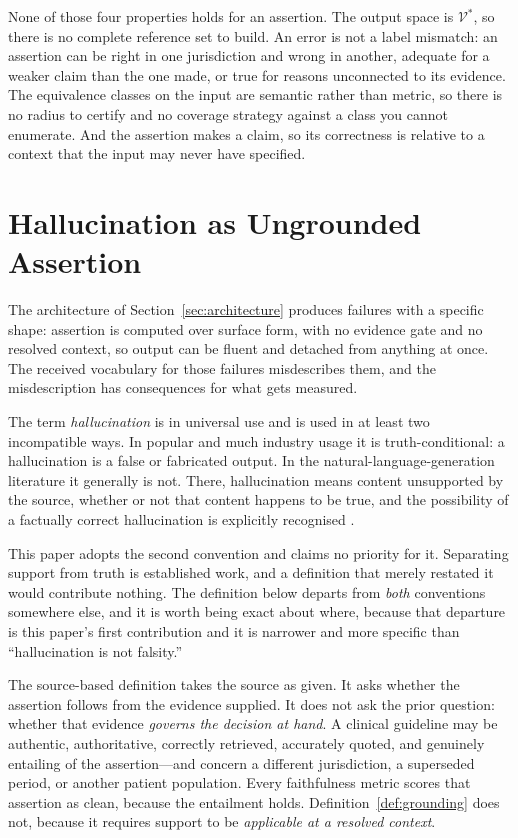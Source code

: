 \documentclass[11pt]{article}
\theoremstyle{plain}
\theoremstyle{definition}
\begin{document}
None of those four properties holds for an assertion. The output space is
$\mathcal{V}^{*}$, so there is no complete reference set to build. An error is not a
label mismatch: an assertion can be right in one jurisdiction and wrong in another,
adequate for a weaker claim than the one made, or true for reasons unconnected to
its evidence. The equivalence classes on the input are semantic rather than metric,
so there is no radius to certify and no coverage strategy against a class you cannot
enumerate. And the assertion makes a claim, so its correctness is relative to a
context that the input may never have specified.


\section{Hallucination as Ungrounded Assertion}
\label{sec:taxonomy}

The architecture of Section~\ref{sec:architecture} produces failures with a specific
shape: assertion is computed over surface form, with no evidence gate and no resolved
context, so output can be fluent and detached from anything at once. The received
vocabulary for those failures misdescribes them, and the misdescription has consequences
for what gets measured.

The term \emph{hallucination} is in universal use and is used in at least two
incompatible ways. In popular and much industry usage it is truth-conditional: a
hallucination is a false or fabricated output. In the natural-language-generation
literature it generally is not. There, hallucination means content unsupported by
the source, whether or not that content happens to be true, and the possibility of a
factually correct hallucination is explicitly recognised
\citep{maynez2020,ji2023}.

This paper adopts the second convention and claims no priority for it. Separating
support from truth is established work, and a definition that merely restated it
would contribute nothing. The definition below departs from \emph{both} conventions
somewhere else, and it is worth being exact about where, because that departure is
this paper's first contribution and it is narrower and more specific than
``hallucination is not falsity.''

The source-based definition takes the source as given. It asks whether the assertion
follows from the evidence supplied. It does not ask the prior question: whether that
evidence \emph{governs the decision at hand}. A clinical guideline may be authentic,
authoritative, correctly retrieved, accurately quoted, and genuinely entailing of the
assertion---and concern a different jurisdiction, a superseded period, or another
patient population. Every faithfulness metric scores that assertion as clean, because
the entailment holds. Definition~\ref{def:grounding} does not, because it requires
support to be \emph{applicable at a resolved context}.
\end{document}
